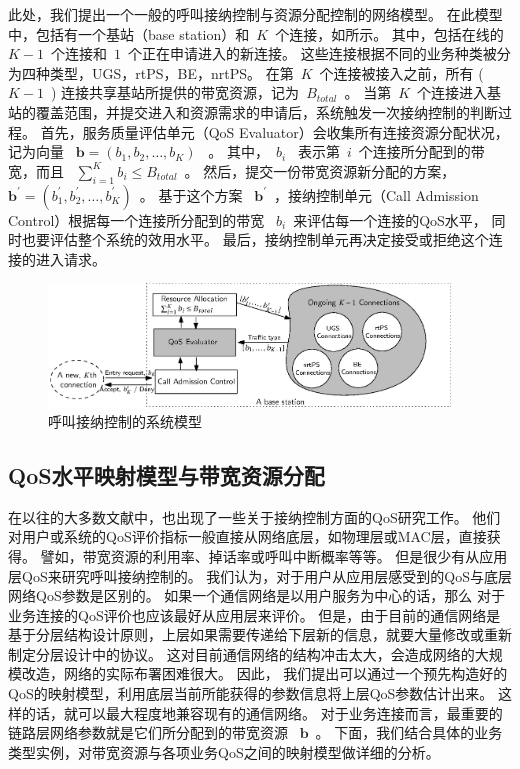 此处，我们提出一个一般的呼叫接纳控制与资源分配控制的网络模型。
在此模型中，包括有一个基站（base station）和~$K$~个连接，如所示。
其中，包括在线的~$K-1$~个连接和~$1$~个正在申请进入的新连接。
这些连接根据不同的业务种类被分为四种类型，UGS，rtPS，BE，nrtPS。
在第~$K$~个连接被接入之前，所有 (~$K-1$~) 连接共享基站所提供的带宽资源，记为~$B_{total}$~。
当第~$K$~个连接进入基站的覆盖范围，并提交进入和资源需求的申请后，系统触发一次接纳控制的判断过程。
首先，服务质量评估单元（QoS Evaluator）会收集所有连接资源分配状况，记为向量 ~$\mathbf{b} = (b_1, b_2, \dots, b_{K})$~ 。
其中，~$b_i$~ 表示第~$i$~个连接所分配到的带宽，而且 ~$\sum_{i=1}^K b_i \le B_{total}$~。
然后，提交一份带宽资源新分配的方案，~$\mathbf{b^\prime} = (b_1^\prime, b_2^\prime, \dots, b_K^\prime)$~。
基于这个方案 ~$\mathbf{b^\prime}$~，接纳控制单元（Call Admission Control）根据每一个连接所分配到的带宽 ~$b_i$~来评估每一个连接的QoS水平，
同时也要评估整个系统的效用水平。
最后，接纳控制单元再决定接受或拒绝这个连接的进入请求。
\begin{figure}[t]
\centering
\includegraphics[width=0.95\textwidth]{cacop_qos_model_system.eps}
\caption{ 呼叫接纳控制的系统模型} \label{fig_system_model_cac}
\end{figure}
\subsection{QoS水平映射模型与带宽资源分配}
在以往的大多数文献中，也出现了一些关于接纳控制方面的QoS研究工作。
他们对用户或系统的QoS评价指标一般直接从网络底层，如物理层或MAC层，直接获得。
譬如，带宽资源的利用率、掉话率或呼叫中断概率等等。
但是很少有从应用层QoS来研究呼叫接纳控制的。
我们认为，对于用户从应用层感受到的QoS与底层网络QoS参数是区别的。
如果一个通信网络是以用户服务为中心的话，那么
对于业务连接的QoS评价也应该最好从应用层来评价。
但是，由于目前的通信网络是基于分层结构设计原则，上层如果需要传递给下层新的信息，就要大量修改或重新制定分层设计中的协议。
这对目前通信网络的结构冲击太大，会造成网络的大规模改造，网络的实际布署困难很大。
因此，
我们提出可以通过一个预先构造好的QoS的映射模型，利用底层当前所能获得的参数信息将上层QoS参数估计出来。
这样的话，就可以最大程度地兼容现有的通信网络。
对于业务连接而言，最重要的链路层网络参数就是它们所分配到的带宽资源 ~$\mathbf{b}$~。
下面，我们结合具体的业务类型实例，对带宽资源与各项业务QoS之间的映射模型做详细的分析。


